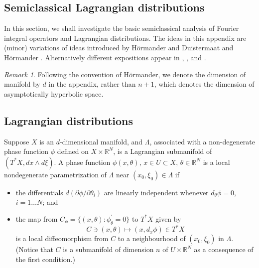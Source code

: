 \documentclass[10pt, a4paper, twoside]{amsart}
\numberwithin{equation}{section}
\theoremstyle{remark}
\newtheorem{remark}[theorem]{Remark}
\begin{document}
\begin{appendix}

\section{Semiclassical Lagrangian distributions}\label{app:sld}

In this section, we shall investigate the basic semiclassical analysis of Fourier integral operators and Lagrangian distributions. The ideas in this appendix are (minor) variations of ideas introduced by  H\"{o}rmander \cite{Hormander-Acta-1971} and Duistermaat and H\"{o}rmander \cite{Duistermaat-Hormander-Acta-1972}. Alternatively different expositions appear in \cite{Hormander4}, \cite{Duistermaat}, \cite{sogge} and \cite{Egorov}.

\begin{remark}Following the convention of H\"{o}rmander, we denote the dimension of manifold by $d$ in the appendix, rather than $n + 1$, which denotes the dimension of asymptotically hyperbolic space.\end{remark}

	\subsection{Lagrangian distributions}
	Suppose $X$ is an $d$-dimensional manifold, and $\Lambda$, associated with a non-degenerate phase function $\phi$ defined on $X \times \mathbb{R}^N$, is a Lagrangian submanifold of $(T^\ast X, dx \wedge d\xi)$. A phase function $\phi(x, \theta)$, $x \in U \subset X$, $\theta \in {\mathbb{R}}^N$ is a local nondegenerate parametrization of $\Lambda$ near $(x_0, \xi_0) \in \Lambda$ if 
	\begin{itemize}
	\item the differentials $d(\partial \phi/\partial \theta_i)$ are linearly independent whenever $d_\theta \phi = 0$, $i = 1 \dots N$; and 
	\item the map from $C_\phi = \{(x, \theta): \phi^\prime_\theta = 0\}$ to $T^* X$ given by 
	$$
	C \ni (x, \theta) \mapsto (x, d_x \phi) \in T^* X
	$$
	is a local diffeomorphism from $C$ to a neighbourhood of $(x_0, \xi_0)$ in $\Lambda$.
	(Notice that $C$ is a submanifold of dimension $n$ of $U \times {\mathbb{R}}^N$ as a consequence of the first condition.) 
	\end{itemize} 
	

\end{appendix}
\end{document}
